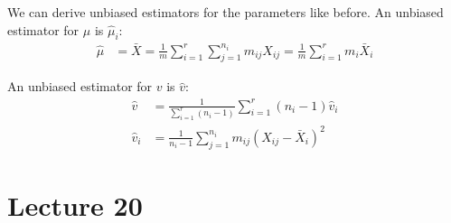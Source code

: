 \documentclass[english,12pt]{article}
\theoremstyle{plain}
\theoremstyle{definition}
\theoremstyle{definition} %
\begin{document}
We can derive unbiased estimators for the parameters like before.  An unbiased estimator for $\mu$ is $\hat{\mu}_i$:
\begin{align*}
\hat{\mu}&=\bar{X}
=\frac{1}{m}\sum_{i=1}^r\sum_{j=1}^{n_i}m_{ij}X_{ij}
=\frac{1}{m}\sum_{i=1}^rm_i\bar{X}_i
\end{align*}

An unbiased estimator for $v$ is $\hat{v}$:
\begin{align*}
\hat{v}&=\frac{1}{\sum_{i=1}^r(n_i-1)}\sum_{i=1}^r(n_i-1)\hat{v}_i\\
\hat{v}_i&=\frac{1}{n_i-1}\sum_{j=1}^{n_i}m_{ij}(X_{ij}-\bar{X}_i)^2
\end{align*}

\section*{Lecture 20}
\end{document}
